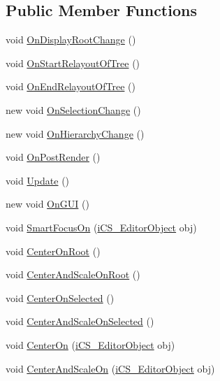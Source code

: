 \subsection*{Public Member Functions}
\begin{DoxyCompactItemize}
\item 
void \hyperlink{classi_c_s___visual_editor_a0e3bd9f68c9d7c31e4c5221dd9f2fb0b}{On\+Display\+Root\+Change} ()
\item 
void \hyperlink{classi_c_s___visual_editor_a0da0c72085e6dba001cbbb70bcecf822}{On\+Start\+Relayout\+Of\+Tree} ()
\item 
void \hyperlink{classi_c_s___visual_editor_a120f38ccfe517ddc5957cf5b9ed68587}{On\+End\+Relayout\+Of\+Tree} ()
\item 
new void \hyperlink{classi_c_s___visual_editor_a7c60ab7cd1a00eee155aca392943b7d3}{On\+Selection\+Change} ()
\item 
new void \hyperlink{classi_c_s___visual_editor_a50ea437d923ec3cebfd784274c4e3d3a}{On\+Hierarchy\+Change} ()
\item 
void \hyperlink{classi_c_s___visual_editor_a6e0844dbe268dc38317cf2e1d3f9f677}{On\+Post\+Render} ()
\item 
void \hyperlink{classi_c_s___visual_editor_a536cdd2e88e7c9fb2d23eb895afebca7}{Update} ()
\item 
new void \hyperlink{classi_c_s___visual_editor_a22460e38c872a62d0e7c5b461ff75a6b}{On\+G\+U\+I} ()
\item 
void \hyperlink{classi_c_s___visual_editor_a36116da8ba7586b1aa57106d19168ffa}{Smart\+Focus\+On} (\hyperlink{classi_c_s___editor_object}{i\+C\+S\+\_\+\+Editor\+Object} obj)
\item 
void \hyperlink{classi_c_s___visual_editor_a935da7961f0a0d50c32e63f0ef1b4ddf}{Center\+On\+Root} ()
\item 
void \hyperlink{classi_c_s___visual_editor_a91163c6d0d6bbd1b2add353224affb33}{Center\+And\+Scale\+On\+Root} ()
\item 
void \hyperlink{classi_c_s___visual_editor_a8dc2dda0884f2ee58f4c237d70ffc23a}{Center\+On\+Selected} ()
\item 
void \hyperlink{classi_c_s___visual_editor_aaa8d344f7ae8eb9a4d195111201d7b7d}{Center\+And\+Scale\+On\+Selected} ()
\item 
void \hyperlink{classi_c_s___visual_editor_abcb8dfd25687076fd446eb5106ffc500}{Center\+On} (\hyperlink{classi_c_s___editor_object}{i\+C\+S\+\_\+\+Editor\+Object} obj)
\item 
void \hyperlink{classi_c_s___visual_editor_a9d123e443ba2f63eb75c57abc028f4bd}{Center\+And\+Scale\+On} (\hyperlink{classi_c_s___editor_object}{i\+C\+S\+\_\+\+Editor\+Object} obj)

\end{DoxyCompactItemize}
